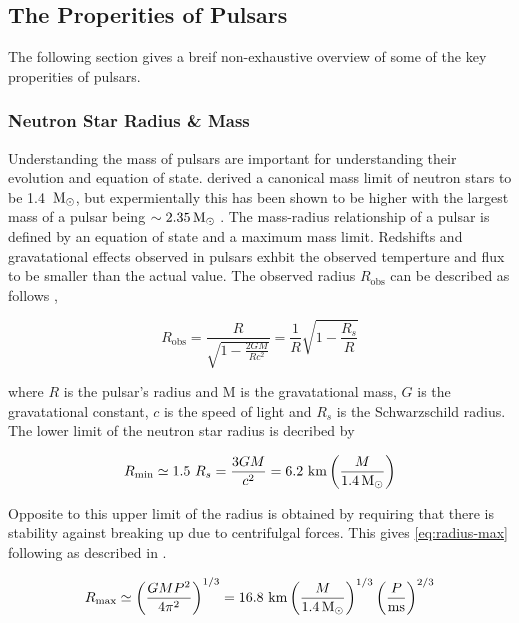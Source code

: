 \subsection{The Properities of Pulsars}

The following section gives a breif non-exhaustive overview of some of the key properities of pulsars. 

\subsubsection{Neutron Star Radius \& Mass}

Understanding the mass of pulsars are important for understanding their evolution and equation of state. \cite{oppenheimer_massive_1939} derived a canonical mass limit of neutron stars to be 1.4 $\, \text{M}_\odot$, but expermientally this has been shown to be higher with the largest mass of a pulsar being $\sim 2.35 \, \text{M}_\odot$ \citep{Romani_2022}. The mass-radius relationship of a pulsar is defined by an equation of state and a maximum mass limit. Redshifts and gravatational effects observed in pulsars exhbit the observed temperture and flux to be smaller than the actual value. The observed radius $R_\text{obs}$ can be described as follows \citep{pulsar_handbook}, 

\begin{equation}
    R_\text{obs} = \frac{R}{\sqrt{1 - \frac{2GM}{Rc^2}}} = \frac{1}{R} \sqrt{1 - \frac{R_s}{R}}
\end{equation}

where $R$ is the pulsar's radius and M is the gravatational mass, $G$ is the gravatational constant, $c$ is the speed of light and $R_s$ is the Schwarzschild radius. \\ 
The lower limit of the neutron star radius is decribed by 

\begin{equation}
    R_\text{min} \simeq 1.5 \ R_s = \frac{3GM}{c^2} = 6.2 \ \text{km} \left( \frac{M}{1.4 \, \text{M}_\odot} \right)
\end{equation}

Opposite to this upper limit of the radius is obtained by requiring that there is stability against breaking up due to centrifulgal forces. This gives \cref{eq:radius-max} following as described in \cite[p.~58]{pulsar_handbook}. 

\begin{equation}
    R_\text{max} \simeq \left(\frac{GMP^2}{4 \pi^2}\right)^{1/3} = 16.8 \ \text{km} \left( \frac{M}{1.4 \, \text{M}_\odot} \right)^{1/3} \left( \frac{P}{\text{ms}} \right)^{2/3}
    \label{eq:radius-max}
\end{equation}

